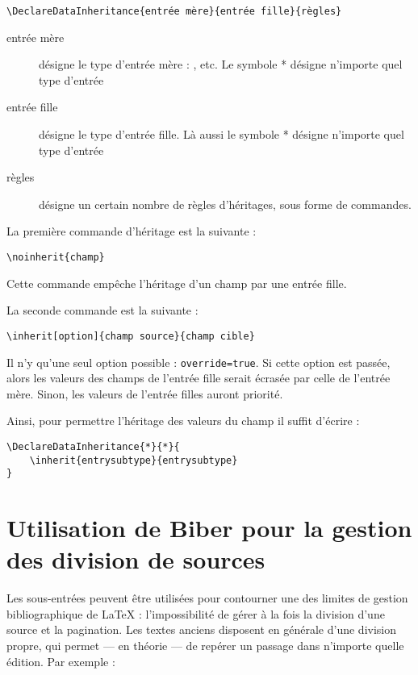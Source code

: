 \begin{verbatim}
\DeclareDataInheritance{entrée mère}{entrée fille}{règles}
\end{verbatim}

\begin{description}
\item[entrée mère]désigne le type d'entrée mère : ,  etc. Le symbole * désigne n'importe quel type d'entrée
\item[entrée fille]désigne le type d'entrée fille. Là aussi le symbole * désigne n'importe quel type d'entrée
\item[règles] désigne un certain nombre de règles d'héritages, sous forme de commandes.
\end{description}

La première commande d'héritage est la suivante :

\begin{verbatim}
\noinherit{champ}
\end{verbatim}

Cette commande empêche l'héritage d'un champ par une entrée fille.

La seconde commande est la suivante :

\begin{verbatim}
\inherit[option]{champ source}{champ cible}
\end{verbatim}

Il n'y qu'une seul option possible : \verb|override=true|. Si cette option est passée, alors les valeurs des champs de l'entrée fille serait écrasée par celle de l'entrée mère. Sinon, les valeurs de l'entrée filles auront priorité.

Ainsi, pour permettre l'héritage des valeurs du champ  il suffit d'écrire :

\begin{verbatim}
\DeclareDataInheritance{*}{*}{
	\inherit{entrysubtype}{entrysubtype}
}
\end{verbatim}

\section[Division des sources antiques]{Utilisation de Biber pour la gestion des division de sources}\label{divisionsource}

Les sous-entrées peuvent être utilisées pour contourner une des limites de gestion bibliographique de \LaTeX{} : l'impossibilité de gérer à la fois  la division d'une source et la pagination. Les textes anciens disposent en générale d'une division propre, qui permet --- en théorie ---  de repérer un passage dans n'importe quelle édition. Par exemple : 


